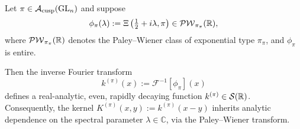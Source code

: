\begin{lemma}
\label{lem:automorphic_kernel_analytic}
Let \( \pi \in \mathcal{A}_{\mathrm{cusp}}(\mathrm{GL}_n) \) and suppose
\[
\phi_\pi(\lambda) := \Xi\left( \tfrac{1}{2} + i\lambda, \pi \right) \in \mathcal{PW}_{{\pi_\pi}}(\mathbb{R}),
\]
where \( \mathcal{PW}_{{\pi_\pi}}(\mathbb{R}) \) denotes the Paley–Wiener class of exponential type \( \pi_\pi \), and \( \phi_\pi \) is entire.

Then the inverse Fourier transform
\[
k^{(\pi)}(x) := \mathcal{F}^{-1}[\phi_\pi](x)
\]
defines a real-analytic, even, rapidly decaying function \( k^{(\pi)} \in \mathcal{S}(\mathbb{R}) \). Consequently, the kernel \( K^{(\pi)}(x, y) := k^{(\pi)}(x - y) \) inherits analytic dependence on the spectral parameter \( \lambda \in \mathbb{C} \), via the Paley–Wiener transform.
\end{lemma}
